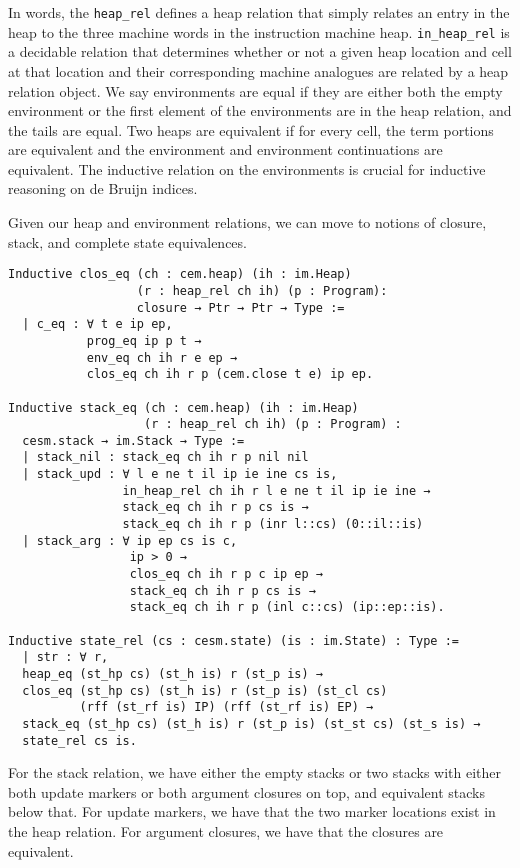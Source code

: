 In words, the \texttt{heap\_rel} defines a heap relation that simply relates an
entry in the \ce heap to the three machine words in the instruction machine
heap. \texttt{in\_heap\_rel} is a decidable relation that determines whether or
not a given heap location and cell at that location and their corresponding
machine analogues are related by a heap relation object. We say environments are
equal if they are either both the empty environment or the first element of the
environments are in the heap relation, and the tails are equal. Two heaps are
equivalent if for every cell, the term portions are equivalent and the
environment and environment continuations are equivalent. The inductive relation
on the environments is crucial for inductive reasoning on de Bruijn indices.

Given our heap and environment relations, we can move to notions of closure,
stack, and complete state equivalences.

\begin{verbatim}
Inductive clos_eq (ch : cem.heap) (ih : im.Heap) 
                  (r : heap_rel ch ih) (p : Program):
                  closure → Ptr → Ptr → Type :=
  | c_eq : ∀ t e ip ep, 
           prog_eq ip p t → 
           env_eq ch ih r e ep →
           clos_eq ch ih r p (cem.close t e) ip ep. 

Inductive stack_eq (ch : cem.heap) (ih : im.Heap) 
                   (r : heap_rel ch ih) (p : Program) : 
  cesm.stack → im.Stack → Type := 
  | stack_nil : stack_eq ch ih r p nil nil
  | stack_upd : ∀ l e ne t il ip ie ine cs is, 
                in_heap_rel ch ih r l e ne t il ip ie ine →
                stack_eq ch ih r p cs is →
                stack_eq ch ih r p (inr l::cs) (0::il::is)
  | stack_arg : ∀ ip ep cs is c, 
                 ip > 0 →
                 clos_eq ch ih r p c ip ep →
                 stack_eq ch ih r p cs is → 
                 stack_eq ch ih r p (inl c::cs) (ip::ep::is).

Inductive state_rel (cs : cesm.state) (is : im.State) : Type := 
  | str : ∀ r, 
  heap_eq (st_hp cs) (st_h is) r (st_p is) →
  clos_eq (st_hp cs) (st_h is) r (st_p is) (st_cl cs) 
          (rff (st_rf is) IP) (rff (st_rf is) EP) →
  stack_eq (st_hp cs) (st_h is) r (st_p is) (st_st cs) (st_s is) →
  state_rel cs is.
\end{verbatim}
For the stack relation, we have either the empty stacks or two stacks with
either both update markers or both argument closures on top, and equivalent
stacks below that. For update markers, we have that the two marker locations
exist in the heap relation. For argument closures, we have that the closures are
equivalent. 


